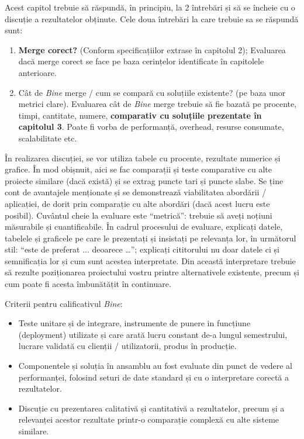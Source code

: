 \documentclass[12pt,a4paper]{report}
\newcommand{\worktype}[1]{[\textit{#1}] }
\newcommand{\dezvoltare}{\worktype{Dezvoltare de produs}}
\newcommand{\cercetare}{\worktype{Cercetare}}
\newcommand{\ambele}{\worktype{Ambele}}
\numberwithin{equation}{section} %
\begin{document}
Acest capitol trebuie să răspundă, în principiu, la 2 întrebări și să se încheie cu o discuție a rezultatelor obținute. Cele doua întrebări la care trebuie sa se răspundă sunt:
\begin{enumerate}
	\item  \textbf{Merge corect?} (Conform specificațiilor extrase în capitolul 2);
	      Evaluarea dacă merge corect se face pe baza cerințelor identificate în capitolele anterioare.

	\item Cât de \textit{Bine} merge / cum se compară cu soluțiile existente? (pe baza unor metrici clare).
	      Evaluarea cât de \textit{Bine} merge trebuie să fie bazată pe procente, timpi, cantitate, numere, \textbf{comparativ cu soluțiile prezentate în capitolul 3}. Poate fi vorba de performanță, overhead, resurse consumate, scalabilitate etc.
\end{enumerate}

În realizarea discuției, se vor utiliza tabele cu procente, rezultate numerice și grafice. În mod obișnuit, aici se fac comparații și teste comparative cu alte proiecte similare (dacă există) și se extrag puncte tari și puncte slabe. Se ține cont de avantajele menționate și se demonstrează viabilitatea abordării / aplicației, de dorit prin comparație cu alte abordări (dacă acest lucru este posibil). Cuvântul cheie la evaluare este ``metrică'': trebuie să aveți noțiuni măsurabile și cuantificabile. În cadrul procesului de evaluare, explicați datele, tabelele și graficele pe care le prezentați și insistați pe relevanța lor, în următorul stil: ``este de preferat ... deoarece …''; explicați cititorului nu doar datele ci și semnificația lor și cum sunt acestea interpretate. Din această interpretare trebuie să rezulte poziționarea proiectului vostru printre alternativele existente, precum și cum poate fi acesta îmbunătățit în continuare.

Criterii pentru calificativul \textit{Bine}:
\begin{itemize}
	\item \dezvoltare Teste unitare și de integrare, instrumente de punere in funcțiune (deployment) utilizate și care arată lucru constant de-a lungul semestrului, lucrare validată cu clienții / utilizatorii, produs în producție.
	\item \cercetare Componentele și soluția în ansamblu au fost evaluate din punct de vedere al performanței, folosind seturi de date standard și cu o interpretare corectă a rezultatelor.
	\item \ambele Discuție cu prezentarea calitativă și cantitativă a rezultatelor, precum și a relevanței acestor rezultate printr-o comparație complexă cu alte sisteme similare.
\end{itemize}
\end{document}
